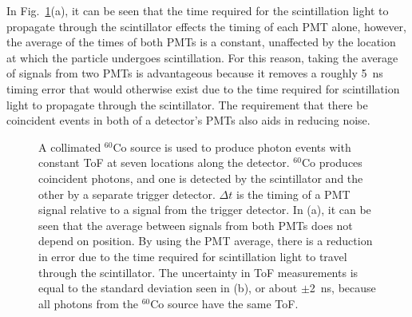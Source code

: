 In Fig.~\ref{fig:ConstPMTAvg}(a), it can be seen that the time required for the scintillation light to propagate through the scintillator effects the timing of each PMT alone, however, the average of the times of both PMTs is a constant, unaffected by the location at which the particle undergoes scintillation.
For this reason, taking the average of signals from two PMTs is advantageous because it removes a roughly 5~ns timing error that would otherwise exist due to the time required for scintillation light to propagate through the scintillator.
The requirement that there be coincident events in both of a detector's PMTs also aids in reducing noise.
\begin{figure}[h]
\centering
{}

\caption{A collimated $^{60}$Co source is used to produce photon events with constant ToF at seven locations along the detector.
$^{60}$Co produces coincident photons, and one is detected by the scintillator and the other by a separate trigger detector.
 $\Delta t$ is the timing of a PMT signal relative to a signal from the trigger detector. 
 In (a), it can be seen that the average between signals from both PMTs does not depend on position.
By using the PMT average, there is a reduction in error due to the time required for scintillation light to travel through the scintillator.
The uncertainty in ToF measurements is equal to the standard deviation seen in (b), or about $\pm$2~ns, because all photons from the $^{60}$Co source have the same ToF.}
\label{fig:ConstPMTAvg}
\end{figure}


